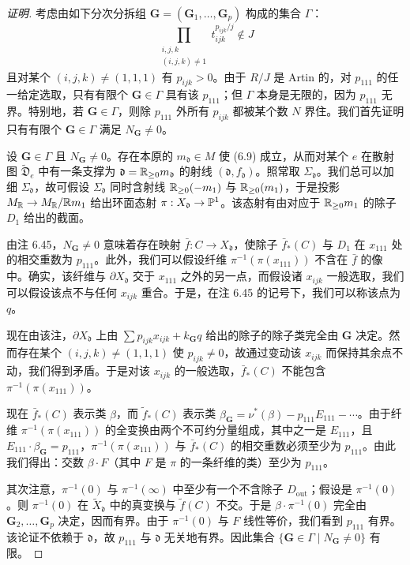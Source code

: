 \begin{proof}[证明]
考虑由如下分次分拆组 $\mathbf{G}=(\mathbf{G}_1,\dots,\mathbf{G}_p)$ 构成的集合 $\Gamma$：
\[
\prod_{\substack{i,j,k\\(i,j,k)\ne1}}t_{ijk}^{p_{ijk}/j}\notin J
\]
且对某个 $(i,j,k)\ne(1,1,1)$ 有 $p_{ijk}>0$。由于 $R/J$ 是 Artin 的，对 $p_{111}$ 的任一给定选取，只有有限个 $\mathbf{G}\in\Gamma$ 具有该 $p_{111}$；但 $\Gamma$ 本身是无限的，因为 $p_{111}$ 无界。特别地，若 $\mathbf{G}\in\Gamma$，则除 $p_{111}$ 外所有 $p_{ijk}$ 都被某个数 $N$ 界住。我们首先证明只有有限个 $\mathbf{G}\in\Gamma$ 满足 $N_{\mathbf{G}}\ne0$。

设 $\mathbf{G}\in\Gamma$ 且 $N_{\mathbf{G}}\ne0$。存在本原的 $m_{\mathfrak{d}}\in M$ 使 (6.9) 成立，从而对某个 $e$ 在散射图 $\tilde{\mathfrak{D}}_e$ 中有一条支撑为 $\mathfrak{d}=\mathbb{R}_{\ge0}m_{\mathfrak{d}}$ 的射线 $(\mathfrak{d},f_{\mathfrak{d}})$。照常取 $\Sigma_{\mathfrak{d}}$。我们总可以加细 $\Sigma_{\mathfrak{d}}$，故可假设 $\Sigma_{\mathfrak{d}}$ 同时含射线 $\mathbb{R}_{\ge0}(-m_1)$ 与 $\mathbb{R}_{\ge0}(m_1)$，于是投影 $M_{\mathbb{R}}\to M_{\mathbb{R}}/\mathbb{R} m_1$ 给出环面态射 $\pi:X_{\mathfrak{d}}\to\mathbb{P}^1$。该态射有由对应于 $\mathbb{R}_{\ge0}m_1$ 的除子 $D_1$ 给出的截面。

由注 6.45，$N_{\mathbf{G}}\ne0$ 意味着存在映射 $\bar f:C\to X_{\mathfrak{d}}$，使除子 $\bar f_*(C)$ 与 $D_1$ 在 $x_{111}$ 处的相交重数为 $p_{111}$。此外，我们可以假设纤维 $\pi^{-1}(\pi(x_{111}))$ 不含在 $\bar f$ 的像中。确实，该纤维与 $\partial X_{\mathfrak{d}}$ 交于 $x_{111}$ 之外的另一点，而假设诸 $x_{ijk}$ 一般选取，我们可以假设该点不与任何 $x_{ijk}$ 重合。于是，在注 6.45 的记号下，我们可以称该点为 $q$。

现在由该注，$\partial X_{\mathfrak{d}}$ 上由 $\sum p_{ijk}x_{ijk}+k_{\mathbf{G}}q$ 给出的除子的除子类完全由 $\mathbf{G}$ 决定。然而存在某个 $(i,j,k)\ne(1,1,1)$ 使 $p_{ijk}\ne0$，故通过变动该 $x_{ijk}$ 而保持其余点不动，我们得到矛盾。于是对该 $x_{ijk}$ 的一般选取，$\bar f_*(C)$ 不能包含 $\pi^{-1}(\pi(x_{111}))$。

现在 $\bar f_*(C)$ 表示类 $\beta$，而 $\tilde f_*(C)$ 表示类 $\beta_{\mathbf{G}}=\nu^*(\beta)-p_{111}E_{111}-\cdots$。由于纤维 $\pi^{-1}(\pi(x_{111}))$ 的全变换由两个不可约分量组成，其中之一是 $E_{111}$，且 $E_{111}\cdot\beta_{\mathbf{G}}=p_{111}$，$\pi^{-1}(\pi(x_{111}))$ 与 $\bar f_*(C)$ 的相交重数必须至少为 $p_{111}$。由此我们得出：交数 $\beta\cdot F$（其中 $F$ 是 $\pi$ 的一条纤维的类）至少为 $p_{111}$。

其次注意，$\pi^{-1}(0)$ 与 $\pi^{-1}(\infty)$ 中至少有一个不含除子 $D_{\mathrm{out}}$；假设是 $\pi^{-1}(0)$。则 $\pi^{-1}(0)$ 在 $\tilde X_{\mathfrak{d}}$ 中的真变换与 $\tilde f(C)$ 不交。于是 $\beta\cdot\pi^{-1}(0)$ 完全由 $\mathbf{G}_2,\dots,\mathbf{G}_p$ 决定，因而有界。由于 $\pi^{-1}(0)$ 与 $F$ 线性等价，我们看到 $p_{111}$ 有界。该论证不依赖于 $\mathfrak{d}$，故 $p_{111}$ 与 $\mathfrak{d}$ 无关地有界。因此集合 $\{\mathbf{G}\in\Gamma\mid N_{\mathbf{G}}\ne0\}$ 有限。


\end{proof}
